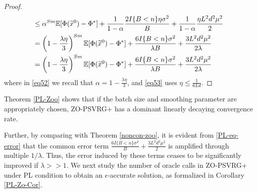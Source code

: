 \documentclass{article}
\newcommand*{\E}{\mathbb{E}}
\theoremstyle{definition}
\theoremstyle{remark}
\begin{document}
\begin{proof}
{\begin{align}
& \leq {\alpha}^{Sm} \E[\Phi(\widetilde{x}^0) - {\Phi}^*] + \frac{1}{1-{\alpha}}\frac{2 I\{B < n\}\eta \sigma ^2}{B}+ \frac{1}{1-{\alpha}}\frac{\eta L^2 d^2 \mu^2}{2}\notag\\
& = \left(1-\frac{\lambda\eta}{3}\right)^{Sm} \E[\Phi(\widetilde{x}^0) - {\Phi}^*] + \frac{6I\{B < n\} \sigma ^2}{\lambda B}+\frac{3 L^2 d^2 \mu^2}{2\lambda}\label{eq52}\\
& = \left(1-\frac{\lambda\eta}{3}\right)^{Sm} \E[\Phi(\widetilde{x}^0) - {\Phi}^*] + \frac{6I\{B < n\} \sigma ^2}{\lambda B}+\frac{3 L^2 d^2 \mu^2}{2\lambda}\label{eq53}
\end{align}
}
where in \eqref{eq52} we recall that {\color{Brown}$\alpha = 1-\frac{\lambda\eta}{3}$}, and \eqref{eq53} uses {\color{Brown}$\eta \leq \frac{1}{6Ld}$}.
\end{proof}
{\color{Brown}
Theorem \ref{PL-Zoo} shows that if the batch size and smoothing parameter are  appropriately chosen, ZO-PSVRG+ has a dominant linearly decaying convergence rate. 

}
Further, by comparing with Theorem \ref{noncon-zoo}, it is evident from \eqref{PL-eq-error} that the
 common error term $\frac{6I\{B < n\} \sigma ^2}{B}+\frac{3L^2 d^2 \mu^2}{2}$ is amplified through multiple $1/\lambda$. Thus, the error induced by these terms ceases to be significantly improved if $\lambda >> 1$. We next study the number of oracle calls in ZO-PSVRG+ under PL condition to obtain an $\epsilon$-accurate solution, as formalized in Corollary \ref{PL-Zo-Cor}. 
\end{document}
